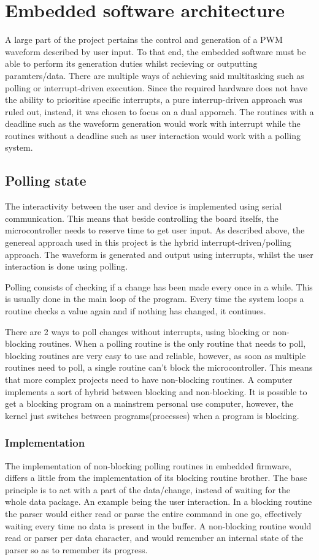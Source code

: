 \section{Embedded software architecture}
A large part of the project pertains the control and generation of a PWM waveform described by
user input. To that end, the embedded software must be able to perform its generation duties whilst
recieving or outputting paramters/data. There are multiple ways of achieving said multitasking such as
polling or interrupt-driven execution. Since the required hardware does not have the ability to prioritise
specific interrupts, a pure interrup-driven approach was ruled out, instead, it was chosen to focus on a dual apporach. The routines with a deadline such as the waveform generation would work with interrupt while the routines without a deadline such as user interaction would work with a polling system.

\subsection{Polling state}
The interactivity between the user and device is implemented using serial communication.
This means that beside controlling the board itselfs, the microcontroller needs to reserve
time to get user input. As described above, the genereal approach used in this project is
the hybrid interrupt-driven/polling approach. The waveform is generated and output using
interrupts, whilst the user interaction is done using polling.

Polling consists of checking if a change has been made every once in a while. This
is usually done in the main loop of the program. Every time the system loops a routine
checks a value again and if nothing has changed, it continues. 

There are 2 ways to poll changes without interrupts, using blocking or non-blocking routines.
When a polling routine is the only routine that needs to poll, blocking routines are
very easy to use and reliable, however, as soon as multiple routines need to poll, a single
routine can't block the microcontroller. This means that more complex projects need to have
non-blocking routines. A computer implements a sort of hybrid between blocking and non-blocking.
It is possible to get a blocking program on a mainstrem personal use computer, however, the kernel
just switches between programs(processes) when a program is blocking.

\subsubsection{Implementation}
The implementation of non-blocking polling routines in embedded firmware, differs a little
from the implementation of its blocking routine brother. The base principle is to act with
a part of the data/change, instead of waiting for the whole data package. An example being
the user interaction. In a blocking routine the parser would either read or parse the entire
command in one go, effectively waiting every time no data is present in the buffer.
A non-blocking routine would read or parser per data character, and would remember an internal
state of the parser so as to remember its progress.

